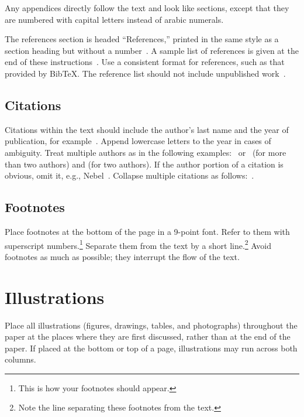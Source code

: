\documentclass{article}
\begin{document}
Any appendices directly follow the text and look like sections, except
that they are numbered with capital letters instead of arabic
numerals.

The references section is headed ``References,'' printed in the same
style as a section heading but without a number~\cite{russell-norvig:Modern}. A sample list of
references is given at the end of these instructions~\cite{rupeneite:Reinforcement}. Use a consistent
format for references, such as that provided by Bib\TeX{}. The reference
list should not include unpublished work~\cite{trc:hs}.

\subsection{Citations}

Citations within the text should include the author's last name and
the year of publication, for example~\cite{trc:ars}.  Append
lowercase letters to the year in cases of ambiguity.  Treat multiple
authors as in the following examples:~\cite{abelson-et-al:scheme}
or~\cite{bgf:Lixto} (for more than two authors) and
\cite{brachman-schmolze:kl-one} (for two authors).  If the author
portion of a citation is obvious, omit it, e.g.,
Nebel~.  Collapse multiple citations as
follows:~\cite{gls:hypertrees,levesque:functional-foundations}.
\nocite{abelson-et-al:scheme}
\nocite{bgf:Lixto}
\nocite{brachman-schmolze:kl-one}
\nocite{gottlob:nonmon}
\nocite{gls:hypertrees}
\nocite{levesque:functional-foundations}
\nocite{levesque:belief}
\nocite{nebel:jair-2000}
\nocite{trc:ars}
\nocite{trc:hs}
\nocite{rupeneite:Reinforcement}
\nocite{russell-norvig:Modern}

\subsection{Footnotes}

Place footnotes at the bottom of the page in a 9-point font.  Refer to
them with superscript numbers.\footnote{This is how your footnotes
should appear.} Separate them from the text by a short
line.\footnote{Note the line separating these footnotes from the
text.} Avoid footnotes as much as possible; they interrupt the flow of
the text.

\section{Illustrations}

Place all illustrations (figures, drawings, tables, and photographs)
throughout the paper at the places where they are first discussed,
rather than at the end of the paper. If placed at the bottom or top of
a page, illustrations may run across both columns.
\end{document}
